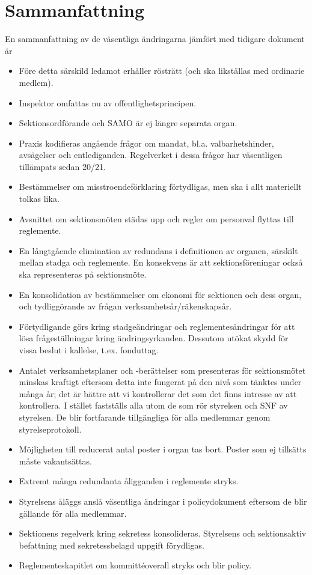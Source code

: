 \documentclass{article}
\begin{document}
\section*{Sammanfattning}
En sammanfattning av de väsentliga ändringarna jämfört med tidigare dokument är
\begin{itemize}
    \item Före detta särskild ledamot erhåller rösträtt (och ska likställas med ordinarie medlem).
    \item Inspektor omfattas nu av offentlighetsprincipen.
    \item Sektionsordförande och SAMO är ej längre separata organ.
    \item Praxis kodifieras angående frågor om mandat, bl.a. valbarhetshinder, avsägelser och entlediganden. Regelverket i dessa frågor har väsentligen tillämpats sedan 20/21.
    \item Bestämmelser om misstroendeförklaring förtydligas, men ska i allt materiellt tolkas lika.
    \item Avsnittet om sektionsmöten städas upp och regler om personval flyttas till reglemente.
    \item En långtgående elimination av redundans i definitionen av organen,
      särskilt mellan stadga och reglemente. En konsekvens är att
      sektionsföreningar också ska representeras på sektionsmöte.
    \item En konsolidation av bestämmelser om ekonomi för sektionen och dess organ, och tydliggörande av frågan verksamhetsår/räkenskapsår.
    \item Förtydligande görs kring stadgeändringar och reglementesändringar för att lösa frågeställningar kring ändringsyrkanden. Dessutom utökat skydd för vissa beslut i kallelse, t.ex. fonduttag.
    \item Antalet verksamhetsplaner och -berättelser som presenteras för sektionsmötet minskas kraftigt eftersom detta inte fungerat på den nivå som tänktes under många år; det är bättre att vi kontrollerar det som det finns intresse av att kontrollera. I stället fastställs alla utom de som rör styrelsen och SNF av styrelsen. De blir fortfarande tillgängliga för alla medlemmar genom styrelseprotokoll.
    \item Möjligheten till reducerat antal poster i organ tas bort. Poster som ej tillsätts måste vakantsättas. 
    \item Extremt många redundanta åligganden i reglemente stryks.
    \item Styrelsens åläggs anslå väsentliga ändringar i policydokument eftersom de blir gällande för alla medlemmar.
    \item Sektionens regelverk kring sekretess konsolideras. Styrelsens och sektionsaktiv befattning med sekretessbelagd uppgift förydligas.
    \item Reglementeskapitlet om kommittéoverall stryks och blir policy.
\end{itemize}    
\end{document}
